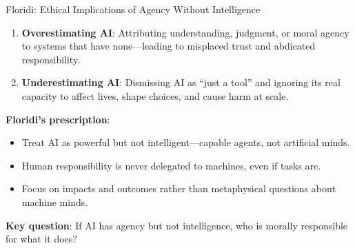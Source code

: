 ﻿\documentclass[aspectratio=169,11pt]{beamer}
\begin{document}
\begin{frame}{Floridi: Ethical Implications of Agency Without Intelligence}
\begin{objectionbox}
\small
\begin{enumerate}
    \item \textbf{Overestimating AI}: Attributing understanding, judgment, or moral agency to systems that have none---leading to misplaced trust and abdicated responsibility.
    \item \textbf{Underestimating AI}: Dismissing AI as ``just a tool'' and ignoring its real capacity to affect lives, shape choices, and cause harm at scale.
\end{enumerate}
\end{objectionbox}

\vspace{0.2em}
\textbf{Floridi's prescription}:
\begin{itemize}
    \item Treat AI as powerful but not intelligent---capable agents, not artificial minds.
    \item Human responsibility is never delegated to machines, even if tasks are.
    \item Focus on impacts and outcomes rather than metaphysical questions about machine minds.
\end{itemize}

\vspace{0.2em}
\textbf{Key question}: If AI has agency but not intelligence, who is morally responsible for what it does?
\end{frame}
\end{document}
